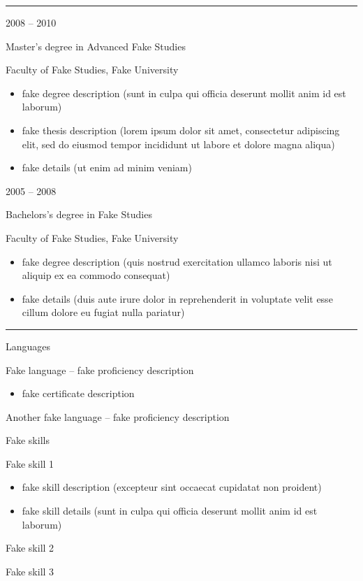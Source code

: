 \documentclass[a4paper,10pt]{article}
\newlength{\cvcolumngapwidth}
\newlength{\cvleftcolumnwidth}
\newlength{\cvrightcolumnwidth}
\newcommand{\cvsectionstyle}[1]{{\normalsize\cvsectionfont\textcolor{cvsectioncolor}{#1}}}
\newcommand{\cvtitlestyle}[1]{{\large\cvtitlefont\textcolor{cvtitlecolor}{#1}}}
\newcommand{\cvdurationstyle}[1]{{\small\cvdurationfont\textcolor{cvdurationcolor}{#1}}}
\newcommand{\cvheadingstyle}[1]{{\normalsize\cvheadingfont\textcolor{cvheadingcolor}{#1}}}
\newlength{\cvafteritemskipamount}
\newlength{\cvaftersectionskipamount}
\newlength{\cvbetweensectionandheadingextraskipamount}
\newlength{\cvaftertitleskipamount}
\newlength{\cvparskip}
\newcommand{\cvsection}[1]{
    \begin{minipage}[t]{\cvleftcolumnwidth}
        \raggedleft\cvsectionstyle{#1}
    \end{minipage}%
    \hspace{\cvcolumngapwidth}%
    \begin{minipage}[t]{\cvrightcolumnwidth}
        \textcolor{cvrulecolor}{\rule{\cvrightcolumnwidth}{0.3mm}}
    \end{minipage}

    \vspace{\cvaftersectionskipamount}
}
\newcommand{\cvitem}[2]{
    \begin{minipage}[t]{\cvleftcolumnwidth}
        \raggedleft #1
    \end{minipage}%
    \hspace{\cvcolumngapwidth}%
    \begin{minipage}[t]{\cvrightcolumnwidth}
        \setlength{\parskip}{\cvparskip} #2
    \end{minipage}

    \vspace{\cvafteritemskipamount}
}
\newcommand{\cvtitle}[1]{
    \cvtitlestyle{#1}

    \vspace{\cvaftertitleskipamount}
    \vspace{-\cvparskip}
}
\begin{document}

\cvsection{EDUCATION}

\cvitem{
    \cvdurationstyle{2008 -- 2010}
}{
    \cvtitle{Master's degree in Advanced Fake Studies}

    Faculty of Fake Studies, Fake University

    \begin{itemize}[leftmargin=*]
        \item fake degree description (sunt in culpa qui officia deserunt mollit anim id est laborum)
        \item fake thesis description (lorem ipsum dolor sit amet, consectetur adipiscing elit, sed do eiusmod tempor
              incididunt ut labore et dolore magna aliqua)
        \item fake details (ut enim ad minim veniam)
    \end{itemize}
}

\cvitem{
    \cvdurationstyle{2005 -- 2008}
}{
    \cvtitle{Bachelors's degree in Fake Studies}

    Faculty of Fake Studies, Fake University

    \begin{itemize}[leftmargin=*]
        \item fake degree description (quis nostrud exercitation ullamco laboris nisi ut aliquip ex ea commodo
              consequat)
        \item fake details (duis aute irure dolor in reprehenderit in voluptate velit esse cillum dolore eu fugiat
              nulla pariatur)
    \end{itemize}
}



\cvsection{SKILLS}

\vspace{\cvbetweensectionandheadingextraskipamount}

\cvitem{
    \cvheadingstyle{Languages}
}{
    Fake language -- fake proficiency description
    \begin{itemize}
        \item fake certificate description
    \end{itemize}

    Another fake language -- fake proficiency description
}

\cvitem{
    \cvheadingstyle{Fake skills}
}{
    Fake skill 1
    \begin{itemize}
        \item fake skill description (excepteur sint occaecat cupidatat non proident)
        \item fake skill details (sunt in culpa qui officia deserunt mollit anim id est laborum)
    \end{itemize}

    Fake skill 2

    Fake skill 3
}
\end{document}
